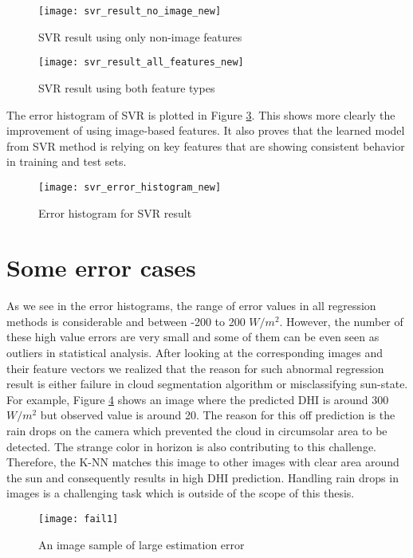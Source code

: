 \begin{figure}[h!]
\caption{SVR result using only non-image features}
\label{fig:svr_result_no_image}
\texttt{[image: svr\_result\_no\_image\_new]}
\centering
\end{figure}

\begin{figure}[h!]
\caption{SVR result using both feature types}
\label{fig:svr_result_all}
\texttt{[image: svr\_result\_all\_features\_new]}
\centering
\end{figure}

The error histogram of SVR is plotted in Figure \ref{fig:err_hist_svr}. This shows more clearly the improvement of using image-based features. It also proves that the learned model from SVR method is relying on key features that are showing consistent behavior in training and test sets.

\begin{figure}[h!]
\caption{Error histogram for SVR result}
\label{fig:err_hist_svr}
\texttt{[image: svr\_error\_histogram\_new]}
\centering
\end{figure}

\section{Some error cases}
As we see in the error histograms, the range of error values in all regression methods is considerable and between -200 to 200 $W/m^2$. However, the number of these high value errors are very small and some of them can be even seen as outliers in statistical analysis.  After looking at the corresponding images and their feature vectors we realized that the reason for such abnormal regression result is either failure in cloud segmentation algorithm or misclassifying sun-state. For example, Figure \ref{fig:img_fail1} shows an image where the predicted DHI is around 300$W/m^2$ but observed value is around 20. The reason for this off prediction is the rain drops on the camera which prevented the cloud in circumsolar area to be detected. The strange color in horizon is also contributing to this challenge. Therefore, the K-NN matches this image to other images with clear area around the sun and consequently results in high DHI prediction. Handling rain drops in images is a challenging task which is outside of the scope of this thesis.

\begin{figure}[h!]
\caption{An image sample of large estimation error}
\label{fig:img_fail1}
\texttt{[image: fail1]}
\centering
\end{figure}


